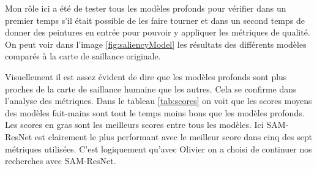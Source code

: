 \par
Mon rôle ici a été de tester tous les modèles profonds pour vérifier dans un premier temps s'il était possible de les faire tourner et dans un second temps de donner des peintures en entrée pour pouvoir y appliquer les métriques de qualité. On peut voir dans l'image \ref{fig:saliencyModel} les résultats des différents modèles comparés à la carte de saillance originale. 

\par
Visuellement il est assez évident de dire que les modèles profonds sont plus proches de la carte de saillance humaine que les autres. Cela se confirme dans l'analyse des métriques. Dans le tableau \ref{tab:scores} on voit que les scores moyens des modèles fait-mains sont tout le temps moins bons que les modèles profonds. Les scores en gras sont les meilleurs scores entre tous les modèles. Ici SAM-ResNet est clairement le plus performant avec le meilleur score dans cinq des sept métriques utilisées. C'est logiquement qu'avec Olivier on a choisi de continuer nos recherches avec SAM-ResNet.

\vfill

